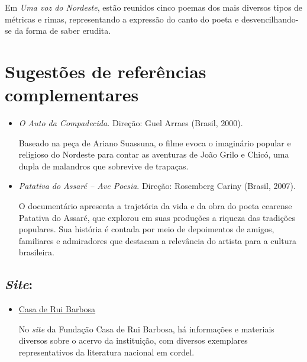 \documentclass[12pt]{extarticle}
\begin{document}
Em \emph{Uma voz do Nordeste}, estão reunidos cinco poemas dos mais
diversos tipos de métricas e rimas, representando a expressão do canto
do poeta e desvencilhando-se da forma de saber erudita.


\section{Sugestões de referências complementares}\label{sugestoes}

\begin{itemize}

\subsection{Filmes:}

\item \textit{O Auto da Compadecida.} Direção: Guel Arraes (Brasil, 2000).

Baseado na peça de Ariano Suassuna, o filme evoca o imaginário popular e
religioso do Nordeste para contar as aventuras de João Grilo e Chicó,
uma dupla de malandros que sobrevive de trapaças.

\item \textit{Patativa do Assaré -- Ave Poesia}. Direção: Rosemberg Cariny
(Brasil, 2007).

O documentário apresenta a trajetória da vida e da obra do poeta
cearense Patativa do Assaré, que explorou em suas produções a riqueza das
tradições populares. Sua história é contada por meio de depoimentos de
amigos, familiares e admiradores que destacam a relevância do artista
para a cultura brasileira.

\end{itemize}

\subsection{\emph{Site}:}

\begin{itemize}

\item \href{http://www.casaruibarbosa.gov.br/cordel/acervo.html}{Casa de Rui Barbosa}

No \emph{site} da Fundação Casa de Rui Barbosa, há informações e
materiais diversos sobre o acervo da instituição, com diversos
exemplares representativos da literatura nacional em cordel.

\end{itemize}
\end{document}
